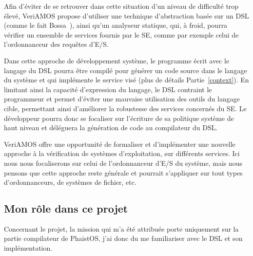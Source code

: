Afin d'éviter de se retrouver dans cette situation d'un niveau de difficulté trop élevé, VeriAMOS propose d'utiliser une technique d'abstraction basée sur un DSL (comme le fait Bossa~\cite{Barreto-Muller:asf2002}), ainsi qu'un analyseur statique, qui, à froid, pourra vérifier un ensemble de services fournis par le SE, comme par exemple celui de l'ordonnanceur des requêtes d'E/S.

Dans cette approche de développement système, le programme écrit avec le langage du DSL pourra être compilé pour générer un code source dans le langage du système et qui implémente le service visé (plus de détails Partie~\ref{context}). En limitant ainsi la capacité d'expression du langage, le DSL contraint le programmeur et permet d'éviter une mauvaise utilisation des outils du langage cible, permettant ainsi d'améliorer la robustesse des services concernés du SE. Le développeur pourra donc se focaliser sur l'écriture de sa politique système de haut niveau et déléguera la génération de code au compilateur du DSL.

VeriAMOS offre une opportunité de formaliser et d'implémenter une nouvelle approche à la vérification de systèmes d'exploitation, sur différents services. Ici nous nous focaliserons sur celui de l'ordonnanceur d'E/S du système, mais nous pensons que cette approche reste générale et pourrait s'appliquer sur tout types d'ordonnanceurs, de systèmes de fichier, etc.

\subsection{Mon rôle dans ce projet}

Concernant le projet, la mission qui m'a été attribuée porte uniquement sur la partie compilateur de PhaistOS, j'ai donc du me familiariser avec le DSL et son implémentation.